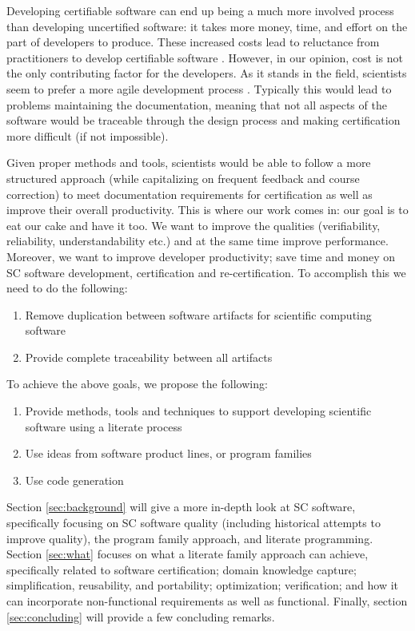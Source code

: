 \documentclass[10pt, preprint]{sigplanconf}
\begin{document}
Developing certifiable software can end up being a much more involved process than developing uncertified software: it takes more money, time, and effort on the part of developers to produce. These increased costs lead to reluctance from practitioners to develop certifiable software \cite{Roache1998}. However, in our %
opinion, cost is not the only contributing factor for the developers. As it stands in the field, scientists seem to prefer a more agile development process \cite{Segal2008}. Typically this would lead to problems maintaining the documentation, meaning that not all aspects of the software would be traceable through the design process and making certification more difficult (if not impossible).

Given proper methods and tools, scientists would be able to follow a more structured approach (while capitalizing on frequent feedback and course correction) to meet documentation requirements for certification as well as improve their overall productivity. This is where our work comes in: our goal is to eat our cake and have it too.  We want to improve the qualities (verifiability, reliability, understandability etc.) and at the same time improve performance.  Moreover, we want to improve developer productivity; save time and money on SC software development, certification and re-certification. To accomplish this we need to do the following:

\begin{enumerate}
	\item Remove duplication between software artifacts for scientific computing software \cite{WilsonEtAl2013}
	\item Provide complete traceability between all artifacts
\end{enumerate}


To achieve the above goals, we propose the following:

\begin{enumerate}
	\item Provide methods, tools and techniques to support developing scientific software using a literate process
	\item Use ideas from software product lines, or program families
	\item Use code generation
\end{enumerate}

Section \ref{sec:background} will give a more in-depth look at SC software, specifically focusing on SC software quality (including historical attempts to improve quality), the program family approach, and literate programming. Section \ref{sec:what} focuses on what a literate family approach can achieve, specifically related to software certification; domain knowledge capture; simplification, reusability, and portability; optimization; verification; and how it can incorporate non-functional requirements as well as functional. Finally, section \ref{sec:concluding} will provide a few concluding remarks.
\end{document}
